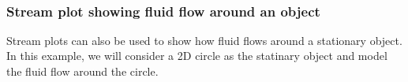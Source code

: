 \documentclass{book}
\begin{document}
    \begin{center}
    \end{center}
    { \hspace*{\fill} \\}
    
    \subsubsection{Stream plot showing fluid flow around an
object}\label{stream-plot-showing-fluid-flow-around-an-object}

Stream plots can also be used to show how fluid flows around a
stationary object. In this example, we will consider a 2D circle as the
statinary object and model the fluid flow around the circle.
\end{document}
